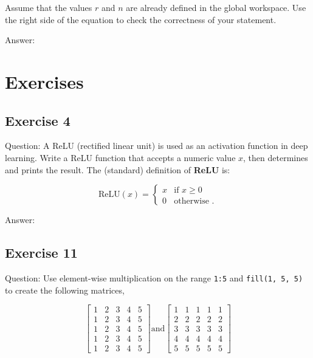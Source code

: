\documentclass{article}
\begin{document}
Assume that the values $r$ and $n$ are already defined in the global workspace. Use the right side of the equation to check the correctness of your statement.


Answer:



\section{Exercises}

\subsection{Exercise 4}

Question: A ReLU (rectified linear unit) is used as an activation function in deep learning. Write a ReLU function that accepts a numeric value $x$, then determines and prints the result. The (standard) definition of \textbf{ReLU} is:

\begin{equation}
  \text{ReLU}(x) =
    \begin{cases}
      x & \text{if $x \geq 0$}\\
      0 & \text{otherwise .}
    \end{cases}       
\end{equation}


Answer:


\subsection{Exercise 11}

Question:
Use element-wise multiplication on the range \lstinline[columns=fixed]{1:5} and \lstinline[columns=fixed]{fill(1, 5, 5)} to create the following matrices,

\[ \begin{bmatrix}{}
1 & 2 & 3 & 4 & 5 \\
1 & 2 & 3 & 4 & 5 \\
1 & 2 & 3 & 4 & 5 \\
1 & 2 & 3 & 4 & 5 \\
1 & 2 & 3 & 4 & 5
\end{bmatrix}
\text{and}
%
\begin{bmatrix}{}
1 & 1 & 1 & 1 & 1 \\
2 & 2 & 2 & 2 & 2 \\
3 & 3 & 3 & 3 & 3 \\
4 & 4 & 4 & 4 & 4 \\
5 & 5 & 5 & 5 & 5
\end{bmatrix}
\]
\end{document}
